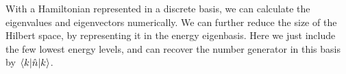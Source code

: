 With a Hamiltonian represented in a discrete basis, we can calculate the eigenvalues and eigenvectors numerically. We can further reduce the size of the Hilbert space, by representing it in the energy eigenbasis. Here we just include the few lowest energy levels, and can recover the number generator in this basis by $\mel{k}{\hat{n}}{k}$. %














